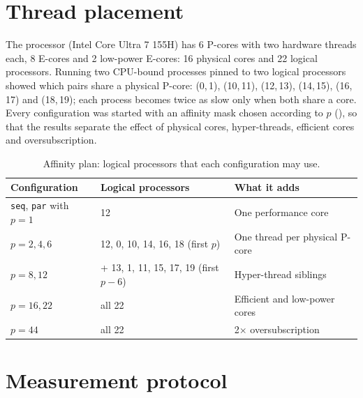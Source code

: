 \documentclass[12pt,a4paper]{report}
\begin{document}
\section{Thread placement}

The processor (Intel Core Ultra 7 155H) has 6 P-cores with two hardware threads each, 8 E-cores and 2 low-power
E-cores: 16 physical cores and 22 logical processors. Running two CPU-bound processes pinned to two logical
processors showed which pairs share a physical P-core: (0,\,1), (10,\,11), (12,\,13), (14,\,15), (16,\,17) and
(18,\,19); each process becomes twice as slow only when both share a core. Every configuration was started with an
affinity mask chosen according to $p$ (), so that the results separate the effect of physical
cores, hyper-threads, efficient cores and oversubscription.

\begin{table}[H]
\centering
\small
\caption{Affinity plan: logical processors that each configuration may use.}
\label{tab:affinity}
\begin{tabular}{lll}
\toprule
\textbf{Configuration} & \textbf{Logical processors} & \textbf{What it adds} \\
\midrule
\texttt{seq}, \texttt{par} with $p = 1$ & 12 & One performance core \\
$p = 2, 4, 6$ & 12, 0, 10, 14, 16, 18 (first $p$) & One thread per physical P-core \\
$p = 8, 12$ & + 13, 1, 11, 15, 17, 19 (first $p-6$) & Hyper-thread siblings \\
$p = 16, 22$ & all 22 & Efficient and low-power cores \\
$p = 44$ & all 22 & 2$\times$ oversubscription \\
\bottomrule
\end{tabular}
\end{table}

\section{Measurement protocol}
\end{document}
